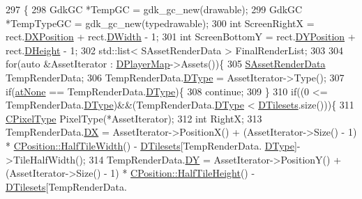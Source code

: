 \begin{DoxyCode}
297                                                                                                        \{
298     GdkGC *TempGC = gdk\_gc\_new(drawable);
299     GdkGC *TempTypeGC = gdk\_gc\_new(typedrawable);
300     \textcolor{keywordtype}{int} ScreenRightX = rect.\hyperlink{structSRectangle_abcbddb03b3ee416cc33109833b5f075c}{DXPosition} + rect.\hyperlink{structSRectangle_a4150898b3f7d90f6e4b0d44bf1ae3bd2}{DWidth} - 1;
301     \textcolor{keywordtype}{int} ScreenBottomY = rect.\hyperlink{structSRectangle_a120aa0a90033bc6e07c36c151a3bbc71}{DYPosition} + rect.\hyperlink{structSRectangle_a84ea3c2314c43cab6186170662188899}{DHeight} - 1;
302     std::list< SAssetRenderData > FinalRenderList;
303     
304     \textcolor{keywordflow}{for}(\textcolor{keyword}{auto} &AssetIterator : \hyperlink{classCAssetRenderer_a422a3f7e4202e73431fba7036e494dfe}{DPlayerMap}->Assets())\{
305         \hyperlink{structSAssetRenderData}{SAssetRenderData} TempRenderData;
306         TempRenderData.\hyperlink{structSAssetRenderData_ae986cfe9d4238fa31fb511b40392d97f}{DType} = AssetIterator->Type();
307         \textcolor{keywordflow}{if}(\hyperlink{GameDataTypes_8h_a5600d4fc433b83300308921974477feca82fb51718e2c00981a2d37bc6fe92593}{atNone} == TempRenderData.\hyperlink{structSAssetRenderData_ae986cfe9d4238fa31fb511b40392d97f}{DType})\{
308             \textcolor{keywordflow}{continue};   
309         \}
310         \textcolor{keywordflow}{if}((0 <= TempRenderData.\hyperlink{structSAssetRenderData_ae986cfe9d4238fa31fb511b40392d97f}{DType})&&(TempRenderData.\hyperlink{structSAssetRenderData_ae986cfe9d4238fa31fb511b40392d97f}{DType} < 
      \hyperlink{classCAssetRenderer_ae8201de704851c1de6424a8da77b785e}{DTilesets}.size()))\{
311             \hyperlink{classCPixelType}{CPixelType} PixelType(*AssetIterator); 
312             \textcolor{keywordtype}{int} RightX;
313             TempRenderData.\hyperlink{structSAssetRenderData_ab432edfd1146e38a92576b78e2ad5581}{DX} = AssetIterator->PositionX() + (AssetIterator->Size() - 1) * 
      \hyperlink{classCPosition_a4b799a0fb78ddd8bbd8548980e2458af}{CPosition::HalfTileWidth}() - \hyperlink{classCAssetRenderer_ae8201de704851c1de6424a8da77b785e}{DTilesets}[TempRenderData.
      \hyperlink{structSAssetRenderData_ae986cfe9d4238fa31fb511b40392d97f}{DType}]->TileHalfWidth();
314             TempRenderData.\hyperlink{structSAssetRenderData_af27e8a46e21a0935983bfc0d34d9ceba}{DY} = AssetIterator->PositionY() + (AssetIterator->Size() - 1) * 
      \hyperlink{classCPosition_a5e371060b1aa0d3d3c5df1e353e0e5fd}{CPosition::HalfTileHeight}() - \hyperlink{classCAssetRenderer_ae8201de704851c1de6424a8da77b785e}{DTilesets}[TempRenderData.

\end{DoxyCode}
